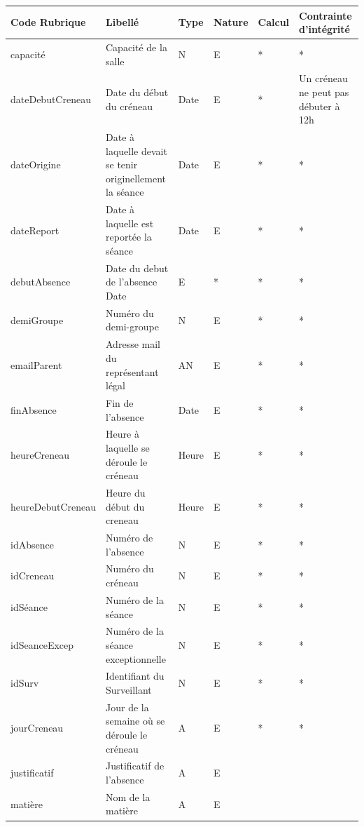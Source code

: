 \documentclass[12pt,french,titlepage]{article}
\begin{document}
	  \begin{tabular}{|p{4cm}|p{3cm}|p{1cm}|p{1cm}|p{1cm}|p{2cm}|}
	  \hline
	      Code Rubrique & Libellé & Type &Nature & Calcul & Contrainte d'intégrité \\ \hline
	      \hline
	       capacité	& Capacité de la salle &	N &	E	& * & *	\\ \hline 
dateDebutCreneau &	Date du début du créneau &	Date &	E & * &		Un créneau ne peut pas débuter à 12h\\ \hline
dateOrigine &	Date à laquelle devait se tenir originellement la séance &	Date &	E & * & *\\ \hline	
dateReport &	Date à laquelle est reportée la séance &	Date &	E & * &*		\\ \hline
debutAbsence &	Date du debut de l'absence	Date &	E &	* & * &*	\\ \hline
demiGroupe	& Numéro du demi-groupe &	N &	E & * & *		\\ \hline
emailParent &	Adresse mail du représentant légal & AN &	E & * & *	\\ \hline	
finAbsence &	Fin de l'absence &	Date &	E & * & * 	\\ \hline
heureCreneau &	Heure à laquelle se déroule le créneau &	Heure &	E & * & *	\\ \hline	
heureDebutCreneau &	Heure du début du creneau &	Heure &	E & * & *	\\ \hline	
idAbsence &	Numéro de l'absence &	N &	E & * & *		\\ \hline
idCreneau &	Numéro du créneau &	N &	E & * & *		\\ \hline
idSéance &	Numéro de la séance	& N &	E & * & *		\\ \hline
idSeanceExcep	& Numéro de la séance exceptionnelle &	N &	E & * & *	\\ \hline	
idSurv	& Identifiant du Surveillant &	N &	E & * & *	\\ \hline	
jourCreneau	& Jour de la semaine où se déroule le créneau &	A &	E & * & *	\\ \hline	
justificatif	& Justificatif de l'absence	& A &	E &  & 	\\ \hline
matière	& Nom de la matière	& A &	E &  & 	\\ \hline

	  \end{tabular}
	  
\end{document}
